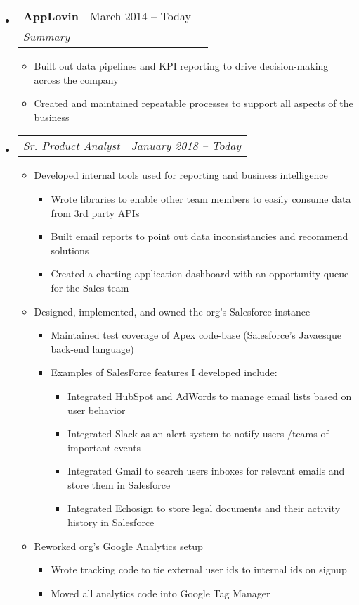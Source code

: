 \documentclass{article}
\newcommand{\resumeheading}[1]{
    \noindent
    \fcolorbox{mygrey}{mygrey}{%
        \parbox{\dimexpr\linewidth-2\fboxsep-2\fboxrule}{\large#1}}
}
\newcommand{\splitresumesubheading}[3]{
    \begin{tabularx}{\linewidth}{XcX}
	    	\textbf{#1} & #2 \\
		    \textit{#3}
    \end{tabularx}
    \vspace{-3ex}
}
\newcommand{\resumesubsubheading}[2]{
    \begin{tabularx}{\linewidth}{Xc}
		\textit{#1} & \textit{#2} \\
    \end{tabularx}
    \vspace{-4ex}
}
\newcommand{\resumeitem}[1]{
    \item #1 
    \vspace{-2pt}
}
\begin{document}
\resumeheading{Experience}
\begin{itemize}
    \item \splitresumesubheading{AppLovin}{March 2014 -- Today}
                                {Summary}
    \begin{itemize}
        \resumeitem{Built out data pipelines and KPI reporting to drive decision-making across the company}
        \resumeitem{Created and maintained repeatable processes to support all aspects of the business}
    \end{itemize}
    \item \resumesubsubheading{Sr. Product Analyst}{January 2018 -- Today}
    \begin{itemize}
        \resumeitem{Developed internal tools used for reporting and business intelligence}
        \begin{itemize}
            \resumeitem{Wrote libraries to enable other team members to easily consume data from 3rd party APIs}
            \resumeitem{Built email reports to point out data inconsistancies and recommend solutions}
            \resumeitem{Created a charting application dashboard with an opportunity queue for the Sales team}
        \end{itemize}
        \resumeitem{Designed, implemented, and owned the org’s Salesforce instance}
        \begin{itemize}
            \resumeitem{Maintained test coverage of Apex code-base (Salesforce's Javaesque back-end language)}
            \resumeitem{Examples of SalesForce features I developed include:}
            \vspace{0ex}
            \begin{itemize}
                \resumeitem{Integrated HubSpot and AdWords to manage email lists based on user behavior}
                \resumeitem{Integrated Slack as an alert system to notify users /teams of important events}
                \resumeitem{Integrated Gmail to search users inboxes for relevant emails and store them in Salesforce}
                \resumeitem{Integrated Echosign to store legal documents and their activity history in Salesforce}
            \end{itemize}
        \end{itemize}
        \resumeitem{Reworked org’s Google Analytics setup}
        \begin{itemize}
            \resumeitem{Wrote tracking code to tie external user ids to internal ids on signup}
            \resumeitem{Moved all analytics code into Google Tag Manager}

\end{itemize}
\end{itemize}
\end{itemize}
\end{document}
